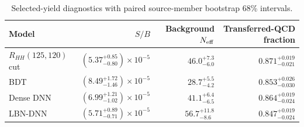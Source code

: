 \begin{table}[tb]
  \centering
  \footnotesize
  \caption{Selected-yield diagnostics with paired source-member bootstrap 68\% intervals.}
  \label{tab:selected-yield-uncertainty-summary}
  \begin{tabular}{lrrr}
    \toprule
    Model & $S/B$ & Background $N_{\rm eff}$ & Transferred-QCD fraction \\
    \midrule
    $R_{HH}(125,120)$ cut & $(5.37^{+0.85}_{-0.80})\times10^{-5}$ & $46.0^{+7.3}_{-6.0}$ & $0.871^{+0.019}_{-0.021}$ \\
    BDT & $(8.49^{+1.72}_{-1.46})\times10^{-5}$ & $28.7^{+5.5}_{-4.2}$ & $0.853^{+0.026}_{-0.030}$ \\
    Dense DNN & $(6.99^{+1.21}_{-1.02})\times10^{-5}$ & $41.1^{+6.4}_{-6.5}$ & $0.864^{+0.019}_{-0.024}$ \\
    LBN-DNN & $(5.71^{+0.89}_{-0.71})\times10^{-5}$ & $56.7^{+11.8}_{-8.6}$ & $0.847^{+0.019}_{-0.024}$ \\
    \bottomrule
  \end{tabular}
\end{table}
